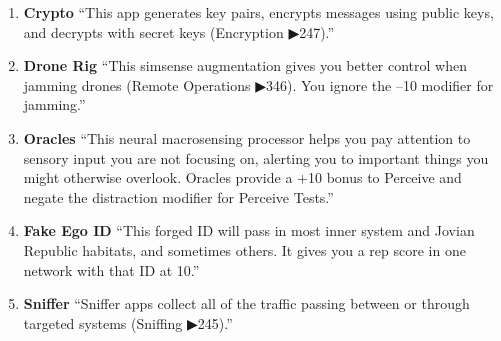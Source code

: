 \begin{enumerate}
    \item \textbf{\gls{Crypto}} “This app generates key pairs, encrypts messages using
    public keys, and decrypts with secret keys (Encryption ▶247).” \citep[pg. 326]{ep2e_1.1_2019}

    \item \textbf{\gls{Drone Rig}} “This simsense augmentation gives you better control when jamming drones (Remote Operations ▶346). You ignore the –10 modifier for jamming.” \citep[pg. 320]{ep2e_1.1_2019}

    \item \textbf{\gls{Oracles}} “This neural macrosensing processor helps you pay attention to sensory input you are not focusing on, alerting you to important things you might otherwise overlook. Oracles provide a +10 bonus to Perceive and negate the distraction modifier for Perceive Tests.” \citep[pg. 319]{ep2e_1.1_2019}



    \item \textbf{\gls{Fake Ego ID}} “This forged ID will pass in most inner system and Jovian Republic habitats, and sometimes others. It gives you a rep score in one network with that ID at 10.” \citep[pg. 315]{ep2e_1.1_2019}

    \item \textbf{Sniffer} “Sniffer apps collect all of the traffic passing between or through targeted systems (Sniffing ▶245).” \citep[pg. 326]{ep2e_1.1_2019}


\end{enumerate}
